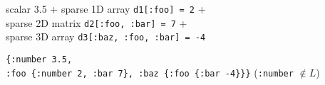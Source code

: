 \documentclass{beamer}
\newcommand{\msgray}[1]{{\color{mygray} #1}}
\begin{document}
\begin{frame}
\begin{columns}[T]
\begin{column}{0.5\textwidth}
\begin{itemize}
{ \item {\tiny  scalar 3.5 + sparse 1D array {\tt d1[:foo] = 2} +\\[1.5ex] sparse 2D
matrix {\tt d2[:foo, :bar] = 7} +\\  sparse 3D array {\tt d3[:baz, :foo, :bar] = -4}}

 \item {\tt \{:number 3.5,\\ :foo \{:number 2, :bar 7\}, :baz \{:foo \{:bar -4\}\}\}}
\msgray{
          ({\tt :number} $\not\in L$)
}
}

\end{itemize}

\end{column}
\end{columns}

\end{frame}
\end{document}

